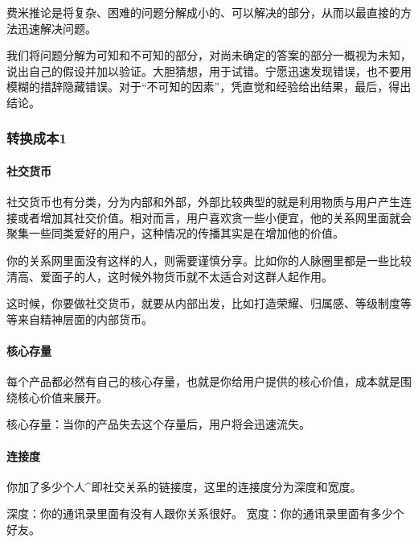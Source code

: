 \documentclass[letterpaper,11pt,english]{sphinxmanual}
\begin{document}
费米推论是将复杂、困难的问题分解成小的、可以解决的部分，从而以最直接的方法迅速解决问题。

我们将问题分解为可知和不可知的部分，对尚未确定的答案的部分一概视为未知，说出自己的假设并加以验证。大胆猜想，用于试错。宁愿迅速发现错误，也不要用模糊的措辞隐藏错误。对于“不可知的因素”，凭直觉和经验给出结果，最后，得出结论。


\subsubsection{转换成本1\sphinxfootnotemark[330]}
\label{\detokenize{chapter_idea/convert:id1}}\label{\detokenize{chapter_idea/convert::doc}}%
\begin{footnotetext}[330]\sphinxAtStartFootnote
{}
%
\end{footnotetext}\ignorespaces 

\paragraph{社交货币}
\label{\detokenize{chapter_idea/convert:id2}}
社交货币也有分类，分为内部和外部，外部比较典型的就是利用物质与用户产生连接或者增加其社交价值。相对而言，用户喜欢贪一些小便宜，他的关系网里面就会聚集一些同类爱好的用户，这种情况的传播其实是在增加他的价值。

你的关系网里面没有这样的人，则需要谨慎分享。比如你的人脉圈里都是一些比较清高、爱面子的人，这时候外物货币就不太适合对这群人起作用。

这时候，你要做社交货币，就要从内部出发，比如打造荣耀、归属感、等级制度等等来自精神层面的内部货币。


\paragraph{核心存量}
\label{\detokenize{chapter_idea/convert:id3}}
每个产品都必然有自己的核心存量，也就是你给用户提供的核心价值，成本就是围绕核心价值来展开。

核心存量：当你的产品失去这个存量后，用户将会迅速流失。


\paragraph{连接度}
\label{\detokenize{chapter_idea/convert:id4}}
你加了多少个人\textasciicircum{}即社交关系的链接度，这里的连接度分为深度和宽度。

深度：你的通讯录里面有没有人跟你关系很好。
宽度：你的通讯录里面有多少个好友。
\end{document}
